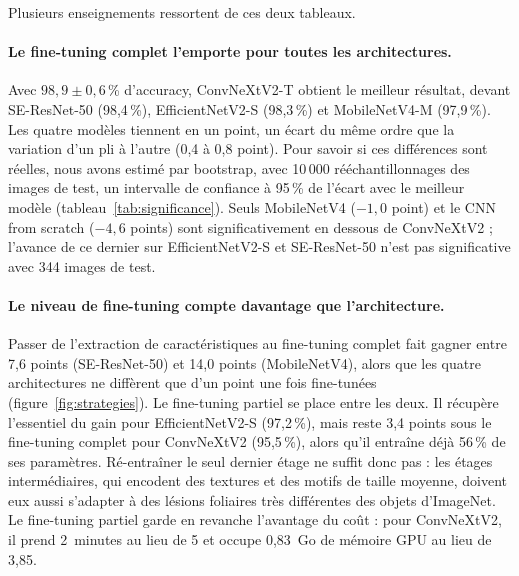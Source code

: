 Plusieurs enseignements ressortent de ces deux tableaux.

\paragraph{Le fine-tuning complet l'emporte pour toutes les architectures.} Avec $98{,}9 \pm 0{,}6$\,\% d'accuracy, ConvNeXtV2-T obtient le meilleur résultat, devant SE-ResNet-50 (98,4\,\%), EfficientNetV2-S (98,3\,\%) et MobileNetV4-M (97,9\,\%). Les quatre modèles tiennent en un point, un écart du même ordre que la variation d'un pli à l'autre (0,4 à 0,8 point). Pour savoir si ces différences sont réelles, nous avons estimé par bootstrap, avec 10\,000 rééchantillonnages des images de test, un intervalle de confiance à 95\,\% de l'écart avec le meilleur modèle (tableau~\ref{tab:significance}). Seuls MobileNetV4 ($-1{,}0$ point) et le CNN from scratch ($-4{,}6$ points) sont significativement en dessous de ConvNeXtV2 ; l'avance de ce dernier sur EfficientNetV2-S et SE-ResNet-50 n'est pas significative avec 344 images de test.

\begin{table}[htbp]
\centering
\caption{Accuracy de test et intervalle de confiance à 95\,\% obtenu par bootstrap sur les images de test (10\,000 tirages). L'écart est mesuré par rapport au meilleur modèle unique, ConvNeXtV2-T (une valeur positive signifie que le modèle fait mieux que lui) ; il est jugé significatif si son intervalle de confiance exclut zéro.}
\label{tab:significance}
\small
{}
\end{table}

\paragraph{Le niveau de fine-tuning compte davantage que l'architecture.} Passer de l'extraction de caractéristiques au fine-tuning complet fait gagner entre 7,6 points (SE-ResNet-50) et 14,0 points (MobileNetV4), alors que les quatre architectures ne diffèrent que d'un point une fois fine-tunées (figure~\ref{fig:strategies}). Le fine-tuning partiel se place entre les deux. Il récupère l'essentiel du gain pour EfficientNetV2-S (97,2\,\%), mais reste 3,4 points sous le fine-tuning complet pour ConvNeXtV2 (95,5\,\%), alors qu'il entraîne déjà 56\,\% de ses paramètres. Ré-entraîner le seul dernier étage ne suffit donc pas : les étages intermédiaires, qui encodent des textures et des motifs de taille moyenne, doivent eux aussi s'adapter à des lésions foliaires très différentes des objets d'ImageNet. Le fine-tuning partiel garde en revanche l'avantage du coût : pour ConvNeXtV2, il prend 2~minutes au lieu de 5 et occupe 0,83~Go de mémoire GPU au lieu de 3,85.

